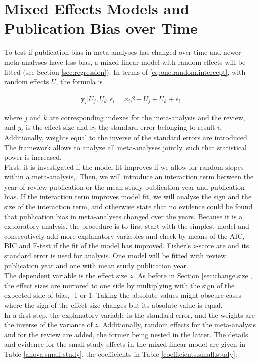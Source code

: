 \documentclass[11pt,a4paper,twoside]{book}\usepackage[]{graphicx}\usepackage[]{color}
\begin{document}
\section{Mixed Effects Models and Publication Bias over Time}
To test if publication bias in meta-analyses has changed over time and newer meta-analyses have less bias, a mixed linear model with random effects will be fitted (see Section \ref{sec:regression}). In terms of \eqref{eq:one.random.intercept}, with random effects $U$, the formula is

\begin{align}
\mathbf{y}_i|U_j,U_k,\epsilon_{i} =  x_i\beta + U_j + U_k + \epsilon_{i} \nonumber
\end{align}

where $j$ and $k$ are corresponding indexes for the meta-analysis and the review, and $y_i$ is the effect size and $x_i$ the standard error belonging to result $i$. Additionally, weights equal to the inverse of the standard errors are introduced. The framework allows to analyze all meta-analyses jointly, such that statistical power is increased.\\   
First, it is investigated if the model fit improves if we allow for random slopes within a meta-analysis,. Then, we will introduce an interaction term between the year of review publication or the mean study publication year and publication bias. If the interaction term improves model fit, we will analyse the sign and the size of the interaction term, and otherwise state that no evidence could be found that publication bias in meta-analyses changed over the years. Because it is a exploratory analysis, the procedure is to first start with the simplest model and consecutively add more explanatory variables and check by means of the AIC, BIC and F-test if the fit of the model has improved. Fisher's $z$-score are and its standard error is used for analysis. One model will be fitted with review publication year and one with mean study publication year.\\
The dependent variable is the effect size $z$. As before in Section \ref{sec:change.size}, the effect sizes are mirrored to one side by multiplying with the sign of the expected side of bias, \ie \vspace{1mm}-1 or 1. Taking the absolute values might obscure cases where the sign of the effect size changes but its absolute value is equal.\\
In a first step, the explanatory variable is the standard error, and the weights are the inverse of the variance of $z$. Additionally, random effects for the meta-analysis and for the review are added, the former being nested in the latter. The details and evidence for the small study effects in the mixed linear model are given in Table \ref{anova.small.study}, the coefficients in Table \ref{coefficients.small.study}:
\end{document}
